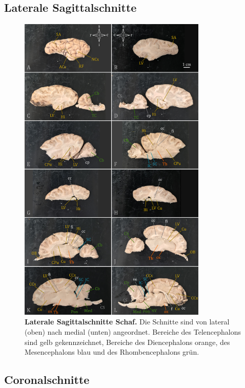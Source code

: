 \documentclass[12pt,a4paper,pdftex]{article}
\begin{document}
\newpage
\subsection{Laterale Sagittalschnitte}
\label{subsec:lateral_sagittal}

\begin{figure}[H]
    \centering
    \includegraphics[width=0.8\textwidth]{pictures/Bilder_Jule/Schaf/lateral_sagittal/schaf_lateral_sagittal.png}
    \caption[Laterale Sagittalschnitte Schaf]{\textbf{Laterale Sagittalschnitte Schaf.} Die Schnitte sind von lateral (oben) nach medial (unten) angeordnet. Bereiche des Telencephalons sind gelb gekennzeichnet, Bereiche des Diencephalons orange, des Mesencephalons blau und des Rhombencephalons grün.}
    \label{fig:schaf_lateral_sagittal}
\end{figure}


\newpage
\subsection{Coronalschnitte}
\label{subsec:coronal}
\end{document}
